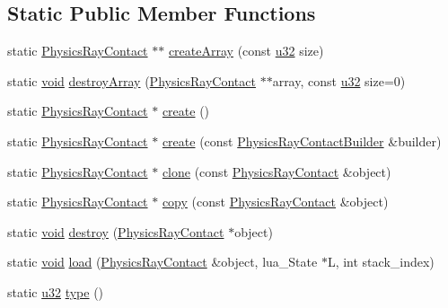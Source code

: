 \subsection*{Static Public Member Functions}
\begin{DoxyCompactItemize}
\item 
static \mbox{\hyperlink{classnjli_1_1_physics_ray_contact}{Physics\+Ray\+Contact}} $\ast$$\ast$ \mbox{\hyperlink{classnjli_1_1_physics_ray_contact_a4292b0c22fcabce21e8f7f066ef84812}{create\+Array}} (const \mbox{\hyperlink{_util_8h_a10e94b422ef0c20dcdec20d31a1f5049}{u32}} size)
\item 
static \mbox{\hyperlink{_thread_8h_af1e856da2e658414cb2456cb6f7ebc66}{void}} \mbox{\hyperlink{classnjli_1_1_physics_ray_contact_a83407a542ac6b4fe3afb856949a6c8f1}{destroy\+Array}} (\mbox{\hyperlink{classnjli_1_1_physics_ray_contact}{Physics\+Ray\+Contact}} $\ast$$\ast$array, const \mbox{\hyperlink{_util_8h_a10e94b422ef0c20dcdec20d31a1f5049}{u32}} size=0)
\item 
static \mbox{\hyperlink{classnjli_1_1_physics_ray_contact}{Physics\+Ray\+Contact}} $\ast$ \mbox{\hyperlink{classnjli_1_1_physics_ray_contact_af2363fea4145cacad545b63386c2b071}{create}} ()
\item 
static \mbox{\hyperlink{classnjli_1_1_physics_ray_contact}{Physics\+Ray\+Contact}} $\ast$ \mbox{\hyperlink{classnjli_1_1_physics_ray_contact_a44731e003241a785dbdb45ae94531c61}{create}} (const \mbox{\hyperlink{classnjli_1_1_physics_ray_contact_builder}{Physics\+Ray\+Contact\+Builder}} \&builder)
\item 
static \mbox{\hyperlink{classnjli_1_1_physics_ray_contact}{Physics\+Ray\+Contact}} $\ast$ \mbox{\hyperlink{classnjli_1_1_physics_ray_contact_a438e26cf68a5d260f2fc3b6d23acd387}{clone}} (const \mbox{\hyperlink{classnjli_1_1_physics_ray_contact}{Physics\+Ray\+Contact}} \&object)
\item 
static \mbox{\hyperlink{classnjli_1_1_physics_ray_contact}{Physics\+Ray\+Contact}} $\ast$ \mbox{\hyperlink{classnjli_1_1_physics_ray_contact_aba4cb7f93abc0faacee4f600760405b3}{copy}} (const \mbox{\hyperlink{classnjli_1_1_physics_ray_contact}{Physics\+Ray\+Contact}} \&object)
\item 
static \mbox{\hyperlink{_thread_8h_af1e856da2e658414cb2456cb6f7ebc66}{void}} \mbox{\hyperlink{classnjli_1_1_physics_ray_contact_a7c45fca2b9c95f31d4fac45b3f20fff0}{destroy}} (\mbox{\hyperlink{classnjli_1_1_physics_ray_contact}{Physics\+Ray\+Contact}} $\ast$object)
\item 
static \mbox{\hyperlink{_thread_8h_af1e856da2e658414cb2456cb6f7ebc66}{void}} \mbox{\hyperlink{classnjli_1_1_physics_ray_contact_acc6851bfddfb4c66a81f7d000fe5b817}{load}} (\mbox{\hyperlink{classnjli_1_1_physics_ray_contact}{Physics\+Ray\+Contact}} \&object, lua\+\_\+\+State $\ast$L, int stack\+\_\+index)
\item 
static \mbox{\hyperlink{_util_8h_a10e94b422ef0c20dcdec20d31a1f5049}{u32}} \mbox{\hyperlink{classnjli_1_1_physics_ray_contact_a46bdbc4c8a6f814a98a9f7f72510b513}{type}} ()
\end{DoxyCompactItemize}
